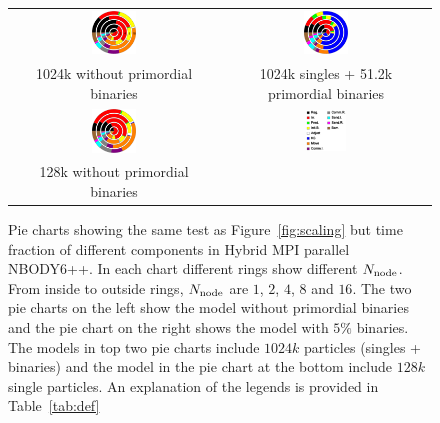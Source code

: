 \documentclass[usenatbib,aas_macros]{mn2e}
\begin{document}
\begin{figure}
  \begin{tabular}{cc}
  \includegraphics[width=0.22\textwidth,height=!]{piechart_n1024k_b0.eps} &
  \includegraphics[width=0.22\textwidth,height=!]{piechart_n1075.2k_b0.05.eps} \\
  {\tiny 1024k without primordial binaries} & {\tiny 1024k singles + 51.2k primordial binaries} \\
  \includegraphics[width=0.22\textwidth,height=!]{piechart_n128k_b0.eps} &
  \includegraphics[width=0.20\textwidth,height=!]{piechart_legend.eps} \\
  {\tiny 128k without primordial binaries} & \\
  \end{tabular}
  \caption{Pie charts showing the same test as Figure~\ref{fig:scaling} but time
    fraction of different components in Hybrid MPI parallel NBODY6++. In each
    chart different rings show different $N_{\rm node}$. From inside to outside
    rings, $N_{\rm node}$ are $1$, $2$, $4$, $8$ and $16$. The two pie charts on the left
    show the model without primordial binaries and the pie chart on the right shows the
    model with $5\%$ binaries. The models in top two pie charts include $1024k$
    particles (singles + binaries) and the model in the pie chart at the bottom
    include $128k$ single particles. An explanation of the legends is provided in
    Table~\ref{tab:def}}
  \label{fig:frac} 
\end{figure}
\end{document}

